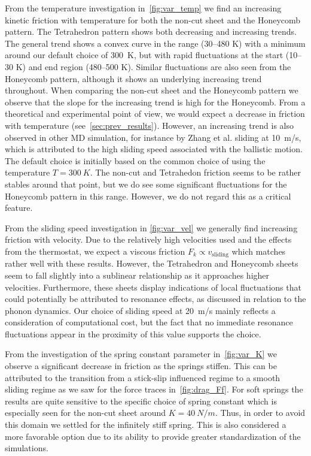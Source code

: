 From the temperature investigation in~\cref{fig:var_temp} we find an increasing
kinetic friction with temperature for both the non-cut sheet and the Honeycomb
pattern. The Tetrahedron pattern shows both decreasing and increasing trends. The general trend shows a convex curve in the range (30--480 K) with a minimum around our default choice of \SI{300}{K}, but with rapid fluctuations at the start (10--30 K) and end region (480--500 K). Similar fluctuations are also seen from the Honeycomb pattern, although it shows an underlying increasing trend throughout. When comparing the non-cut sheet and the Honeycomb pattern we observe that the slope for the increasing trend is high for the Honeycomb. From a theoretical and experimental point of view, we would expect a decrease in friction with temperature (see~\cref{sec:prev_results}). However, an increasing trend is also observed in other \acrshort{MD} simulation, for instance by Zhang et al.
\cite{ma12091425} sliding at \SI{10}{m/s}, which is attributed to the high sliding speed associated with the ballistic motion. The default choice is initially based on the common choice of using the temperature $T = \SI{300}{K}$. The non-cut and Tetrahedon friction seems to be rather stables around that point, but we do see some significant fluctuations for the Honeycomb pattern in this range. However, we do not regard this as a critical feature.

From the sliding speed investigation in \cref{fig:var_vel} we generally find increasing friction with velocity. Due to the relatively high velocities used and the effects from the thermostat, we expect a viscous friction $F_k \propto v_{\text{sliding}}$ which matches rather well with these results. However, the Tetrahedron and Honeycomb sheets seem to fall slightly into a sublinear relationship as it approaches higher velocities. Furthermore, these sheets display indications of local fluctuations that could potentially be attributed to resonance effects, as discussed in relation to the phonon dynamics. Our choice of sliding speed at \SI{20}{m/s} mainly reflects a consideration of computational cost, but the fact that no immediate resonance fluctuations appear in the proximity of this value supports the choice.  

From the investigation of the spring constant parameter in~\cref{fig:var_K} we observe a significant decrease in friction as the springs stiffen. This can be attributed to the transition from a stick-slip influenced regime to a smooth sliding regime as we saw for the force traces in~\cref{fig:drag_Ff}. For soft springs the results are quite sensitive to the specific choice of spring constant which is especially seen for the non-cut sheet around $K = \SI{40}{N/m}$. Thus, in order to avoid this domain we settled for the infinitely stiff spring. This is also considered a more favorable option due to its ability to provide greater standardization of the simulations.

